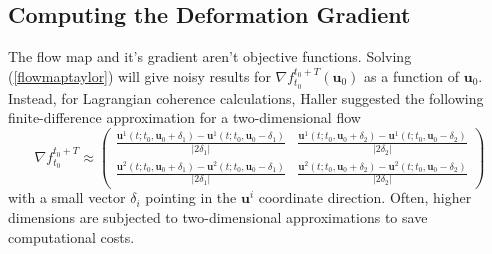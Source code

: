 \subsection{Computing the Deformation Gradient}
The flow map and it's gradient aren't objective functions. Solving (\ref{flowmaptaylor}) will give noisy results for $ \nabla f_{t_{0}}^{t_{0}+T}(\textbf{u}_{0}) $ as a function of $ \textbf{u}_{0} $. Instead, for Lagrangian coherence calculations, Haller suggested the following finite-difference approximation for a two-dimensional flow
\begin{equation}
		\nabla f_{t_{0}}^{t_{0}+T} \approx
		\begin{pmatrix}
			\frac{\textbf{u}^{1}(t; t_{0}, \textbf{u}_{0}+\delta_{1}) - \textbf{u}^{1}(t; t_{0}, \textbf{u}_{0}-\delta_{1})}{\vert 2\delta_{1} \vert} & \frac{\textbf{u}^{1}(t; t_{0}, \textbf{u}_{0}+\delta_{2}) - \textbf{u}^{1}(t; t_{0}, \textbf{u}_{0}-\delta_{2})}{\vert 2\delta_{2} \vert}  \\
			\frac{\textbf{u}^{2}(t; t_{0}, \textbf{u}_{0}+\delta_{1}) - \textbf{u}^{2}(t; t_{0}, \textbf{u}_{0}-\delta_{1})}{\vert 2\delta_{1} \vert} & \frac{\textbf{u}^{2}(t; t_{0}, \textbf{u}_{0}+\delta_{2}) - \textbf{u}^{2}(t; t_{0}, \textbf{u}_{0}-\delta_{2})}{\vert 2\delta_{2} \vert} 
		\end{pmatrix} 
\end{equation}
with a small vector $ \delta_{i} $ pointing in the $\textbf{u}^{i}$ coordinate direction. Often, higher dimensions are subjected to two-dimensional approximations to save computational costs.

